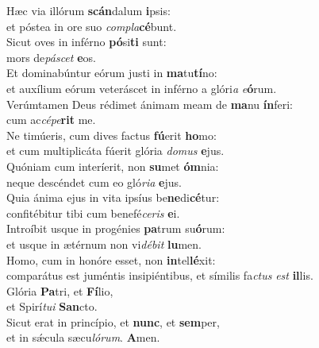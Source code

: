 \oddverse Hæc via illórum \textbf{scán}dalum \textbf{i}psis:~\*\\
\oddverse et póstea in ore suo \textit{com}\textit{pla}\textbf{cé}bunt.\\
\evenverse Sicut oves in inférno \textbf{pó}si\textbf{ti} sunt:~\*\\
\evenverse mors de\textit{pá}\textit{scet} \textbf{e}os.\\
\oddverse Et dominabúntur eórum justi in \textbf{ma}tu\textbf{tí}no:~\*\\
\oddverse et auxílium eórum veteráscet in inférno a glóri\textit{a} \textit{e}\textbf{ó}rum.\\
\evenverse Verúmtamen Deus rédimet ánimam meam de \textbf{ma}nu \textbf{ín}feri:~\*\\
\evenverse cum ac\textit{cé}\textit{pe}\textbf{rit} me.\\
\oddverse Ne timúeris, cum dives factus \textbf{fú}erit \textbf{ho}mo:~\*\\
\oddverse et cum multiplicáta fúerit glória \textit{do}\textit{mus} \textbf{e}jus.\\
\evenverse Quóniam cum interíerit, non \textbf{su}met \textbf{óm}nia:~\*\\
\evenverse neque descéndet cum eo gló\textit{ri}\textit{a} \textbf{e}jus.\\
\oddverse Quia ánima ejus in vita ipsíus be\textbf{ne}di\textbf{cé}tur:~\*\\
\oddverse confitébitur tibi cum benefé\textit{ce}\textit{ris} \textbf{e}i.\\
\evenverse Introíbit usque in progénies \textbf{pa}trum su\textbf{ó}rum:~\*\\
\evenverse et usque in ætérnum non vi\textit{dé}\textit{bit} \textbf{lu}men.\\
\oddverse Homo, cum in honóre esset, non \textbf{in}tel\textbf{lé}xit:~\*\\
\oddverse comparátus est juméntis insipiéntibus, et símilis fa\textit{ctus} \textit{est} \textbf{il}lis.\\
\evenverse Glória \textbf{Pa}tri, et \textbf{Fí}lio,~\*\\
\evenverse et Spirí\textit{tu}\textit{i} \textbf{San}cto.\\
\oddverse Sicut erat in princípio, et \textbf{nunc}, et \textbf{sem}per,~\*\\
\oddverse et in sǽcula sæcu\textit{ló}\textit{rum}. \textbf{A}men.\\

